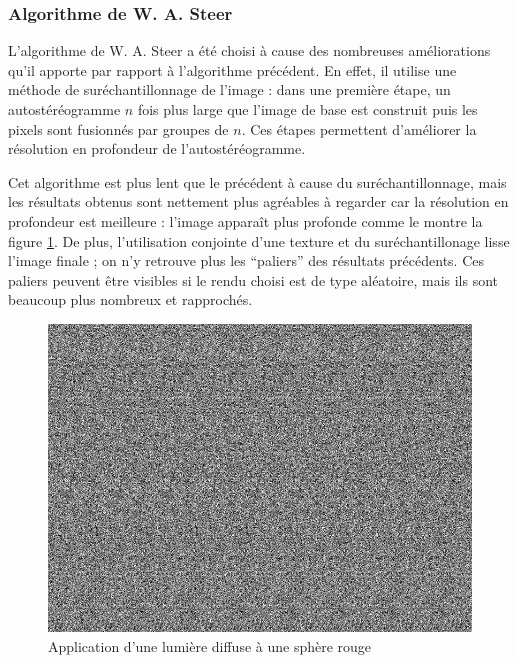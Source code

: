   \subsubsection{Algorithme de W. A. Steer}
  
  L'algorithme de W. A. Steer a été choisi à cause des nombreuses améliorations qu'il apporte par rapport à l'algorithme précédent. En effet, il utilise une méthode de suréchantillonnage de l'image : dans une première étape, un autostéréogramme $n$ fois plus large que l'image de base est construit puis les pixels sont fusionnés par groupes de $n$. Ces étapes permettent d'améliorer la résolution en profondeur de l'autostéréogramme.
  
  Cet algorithme est plus lent que le précédent à cause du suréchantillonnage, mais les résultats obtenus sont nettement plus agréables à regarder car la résolution en profondeur est meilleure : l'image apparaît plus profonde comme le montre la figure \ref{fig:autoste2}. De plus, l'utilisation conjointe d'une texture et du suréchantillonage lisse l'image finale ; on n'y retrouve plus les ``paliers'' des résultats précédents. Ces paliers peuvent être visibles si le rendu choisi est de type aléatoire, mais ils sont beaucoup plus nombreux et rapprochés.

\begin{figure}[h]
	\centering
	\includegraphics[scale=0.3]{autoste2.png}
	\caption{\label{fig:autoste2} Application d’une lumière diffuse à une sphère rouge \protect}
\end{figure}
